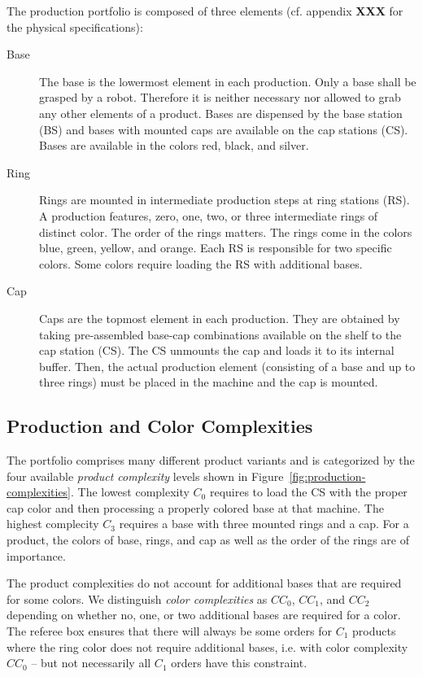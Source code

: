 \documentclass[12pt,twoside]{article}
\newcommand{\reffig}[1]{Figure~\ref{#1}}
\begin{document}
The production portfolio is composed of three elements (cf. appendix
\textbf{XXX} for the physical specifications):
\begin{description}
\item[Base] The base is the lowermost element in each production. Only
  a base shall be grasped by a robot. Therefore it is neither
  necessary nor allowed to grab any other elements of a product. Bases
  are dispensed by the base station (BS) and bases with mounted caps
  are available on the cap stations (CS). Bases are available in the
  colors red, black, and silver.
\item[Ring] Rings are mounted in intermediate production steps at ring
  stations (RS). A production features, zero, one, two, or three
  intermediate rings of distinct color. The order of the rings
  matters. The rings come in the colors blue, green, yellow, and
  orange. Each RS is responsible for two specific colors. Some colors
  require loading the RS with additional bases.
\item[Cap] Caps are the topmost element in each production. They are
  obtained by taking pre-assembled base-cap combinations available on
  the shelf to the cap station (CS). The CS unmounts the cap and loads
  it to its internal buffer. Then, the actual production element
  (consisting of a base and up to three rings) must be placed in the
  machine and the cap is mounted.
\end{description}

\subsection{Production and Color Complexities}
\label{sec:production-complexities}
The portfolio comprises many different product variants and is
categorized by the four available \emph{product complexity} levels
shown in \reffig{fig:production-complexities}. The lowest complexity
$C_0$ requires to load the CS with the proper cap color and then
processing a properly colored base at that machine. The highest
complecity $C_3$ requires a base with three mounted rings and a
cap. For a product, the colors of base, rings, and cap as well as the
order of the rings are of importance.

The product complexities do not account for additional bases that are
required for some colors. We distinguish \emph{color complexities} as
$CC_0$, $CC_1$, and $CC_2$ depending on whether no, one, or two
additional bases are required for a color. The referee box ensures
that there will always be some orders for $C_1$ products where the
ring color does not require additional bases, i.e. with color
complexity $CC_0$ -- but not necessarily all $C_1$ orders have this
constraint.
\end{document}
